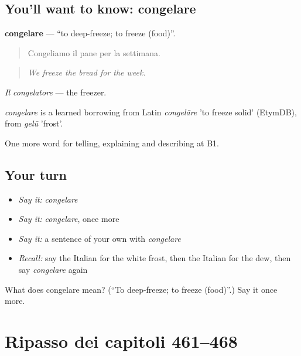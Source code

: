 \subsection*{You'll want to know: congelare}
\textbf{congelare} — \textquotedblleft{}to deep-freeze; to freeze (food)\textquotedblright{}.

\begin{quote}
Congeliamo il pane per la settimana.
\end{quote}

\begin{quote}
\emph{We freeze the bread for the week.}
\end{quote}

\emph{Il congelatore} — the freezer.

\begin{cousinweb}
\emph{congelare} is a learned borrowing from Latin \emph{congelāre} 'to freeze solid' (EtymDB), from \emph{gelū} 'frost'.
\end{cousinweb}

\begin{grammarlens}[title={What you've built}]
One more word for telling, explaining and describing at B1.
\end{grammarlens}

\subsection*{Your turn}
\begin{itemize}
\raggedright
  \item \emph{Say it:} \emph{congelare}
  \item \emph{Say it:} \emph{congelare}, once more
  \item \emph{Say it:} a sentence of your own with \emph{congelare}
  \item \emph{Recall:} say the Italian for the white frost, then the Italian for the dew, then say \emph{congelare} again
\end{itemize}

\begin{tcolorbox}[breakable,colback=teal!4,colframe=teal!35!black,title={Before you move on}]
What does congelare mean? (\textquotedblleft{}To deep-freeze; to freeze (food)\textquotedblright{}.) Say it once more.
\end{tcolorbox}
\section[(dialogue)]{Ripasso dei capitoli 461–468}

